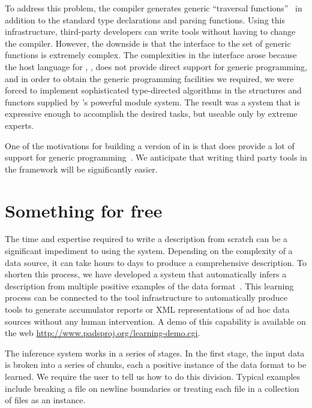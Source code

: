 \documentclass{sig-alternate}
\begin{document}
To address this problem, the \padsml{} compiler generates
generic ``traversal functions''~\cite{mandelbaum+:pads-ml,fernandez+:padl} 
in addition to the standard type declarations and parsing functions.
Using this infrastructure, third-party developers can write tools
without having to change the compiler.  However, the downside
is that the interface to the set of generic
functions is extremely complex. The complexities in the interface
arose because the host language for \padsml,
\ocaml{}, does not provide direct support for generic programming,
and in order to obtain the generic programming facilities we required,
we were forced to implement sophisticated type-directed algorithms in the
structures and functors supplied by \ocaml{}'s powerful
module system.  The result was a system that is expressive enough to
accomplish the desired tasks, but useable only by extreme experts.  

One
of the motivations for building a version of \pads{} in \haskell{} is
that \haskell{} does provide a lot of support for generic
programming~\cite{Wadler+:typeclass,Lammel+:syb}.  We anticipate that
writing third party tools in the \padshaskell{} framework will be
significantly easier.

\section{Something for free}
\label{sec:inference}
The time and expertise required to write a \pads{} description from
scratch can be a significant impediment to using the system.
Depending on the complexity of a data source, it can take hours to
days to produce a comprehensive \pads{} description.  To shorten this
process, we have developed a system that automatically infers a
\pads{} description from multiple positive examples of the data
format~\cite{Fisher+:dirttoshovels}.  This learning process can be
connected to the \pads{} tool infrastructure to automatically produce
tools to generate accumulator reports or XML representations of ad hoc
data sources without any human intervention.  A demo of this
capability is available on the web
\url{http://www.padsproj.org/learning-demo.cgi}. 

The inference system works in a series of stages.  In the first stage,
the input data is broken into a series of chunks, each a positive
instance of the data format to be learned.  We require the user to
tell us how to do this division.  Typical examples include breaking a
file on newline boundaries or treating each file in a collection of
files as an instance.  
\end{document}
